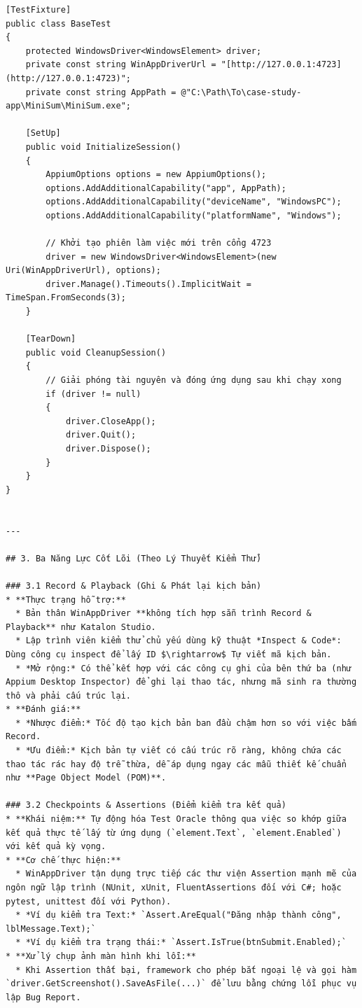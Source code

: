 \begin{lstlisting}
[TestFixture]
public class BaseTest
{
    protected WindowsDriver<WindowsElement> driver;
    private const string WinAppDriverUrl = "[http://127.0.0.1:4723](http://127.0.0.1:4723)";
    private const string AppPath = @"C:\Path\To\case-study-app\MiniSum\MiniSum.exe";

    [SetUp]
    public void InitializeSession()
    {
        AppiumOptions options = new AppiumOptions();
        options.AddAdditionalCapability("app", AppPath);
        options.AddAdditionalCapability("deviceName", "WindowsPC");
        options.AddAdditionalCapability("platformName", "Windows");
        
        // Khởi tạo phiên làm việc mới trên cổng 4723
        driver = new WindowsDriver<WindowsElement>(new Uri(WinAppDriverUrl), options);
        driver.Manage().Timeouts().ImplicitWait = TimeSpan.FromSeconds(3);
    }

    [TearDown]
    public void CleanupSession()
    {
        // Giải phóng tài nguyên và đóng ứng dụng sau khi chạy xong
        if (driver != null)
        {
            driver.CloseApp();
            driver.Quit();
            driver.Dispose();
        }
    }
}


---

## 3. Ba Năng Lực Cốt Lõi (Theo Lý Thuyết Kiểm Thử)

### 3.1 Record & Playback (Ghi & Phát lại kịch bản)
* **Thực trạng hỗ trợ:**
  * Bản thân WinAppDriver **không tích hợp sẵn trình Record & Playback** như Katalon Studio.
  * Lập trình viên kiểm thử chủ yếu dùng kỹ thuật *Inspect & Code*: Dùng công cụ inspect để lấy ID $\rightarrow$ Tự viết mã kịch bản.
  * *Mở rộng:* Có thể kết hợp với các công cụ ghi của bên thứ ba (như Appium Desktop Inspector) để ghi lại thao tác, nhưng mã sinh ra thường thô và phải cấu trúc lại.
* **Đánh giá:**
  * *Nhược điểm:* Tốc độ tạo kịch bản ban đầu chậm hơn so với việc bấm Record.
  * *Ưu điểm:* Kịch bản tự viết có cấu trúc rõ ràng, không chứa các thao tác rác hay độ trễ thừa, dễ áp dụng ngay các mẫu thiết kế chuẩn như **Page Object Model (POM)**.

### 3.2 Checkpoints & Assertions (Điểm kiểm tra kết quả)
* **Khái niệm:** Tự động hóa Test Oracle thông qua việc so khớp giữa kết quả thực tế lấy từ ứng dụng (`element.Text`, `element.Enabled`) với kết quả kỳ vọng.
* **Cơ chế thực hiện:**
  * WinAppDriver tận dụng trực tiếp các thư viện Assertion mạnh mẽ của ngôn ngữ lập trình (NUnit, xUnit, FluentAssertions đối với C#; hoặc pytest, unittest đối với Python).
  * *Ví dụ kiểm tra Text:* `Assert.AreEqual("Đăng nhập thành công", lblMessage.Text);`
  * *Ví dụ kiểm tra trạng thái:* `Assert.IsTrue(btnSubmit.Enabled);`
* **Xử lý chụp ảnh màn hình khi lỗi:**
  * Khi Assertion thất bại, framework cho phép bắt ngoại lệ và gọi hàm `driver.GetScreenshot().SaveAsFile(...)` để lưu bằng chứng lỗi phục vụ lập Bug Report.


\end{lstlisting}

